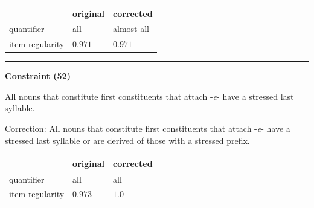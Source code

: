 \vspace{-0.25em}

\begin{table}[!ht]

\begin{center}

\begin{tabularx}{\columnwidth}{|X|X|X|}
      \hline
                        & original      & corrected \\
      \hline
      quantifier        & all      & almost all   \\
      \hline
      item regularity   & $0.971$      & $0.971$   \\
      \hline
\end{tabularx}
\end{center}
\end{table}

\vspace{-0.75em}
\hrule




\vspace{0.6em}

\begin{center}
\textbf{Constraint (52)}
\end{center}

\noindent
All nouns that constitute first constituents that attach -\textit{e}- have a stressed last syllable.
\vspace{0.3em}

\noindent
Correction: All nouns that constitute first constituents that attach -\textit{e}- have a stressed last syllable \underline{or are derived of those with a stressed prefix}.

\vspace{-0.25em}

\begin{table}[!ht]

\begin{center}

\begin{tabularx}{\columnwidth}{|X|X|X|}
      \hline
                        & original      & corrected \\
      \hline
      quantifier        & all      & all   \\
      \hline
      item regularity   & $0.973$      & $1.0$   \\
      \hline
\end{tabularx}
\end{center}
\end{table}

